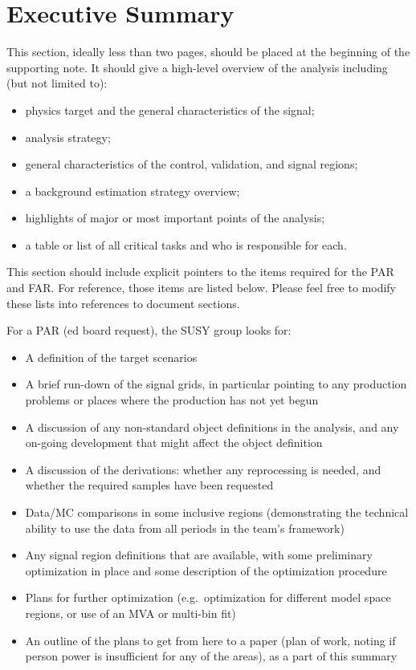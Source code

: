 \section{Executive Summary}

This section, ideally less than two pages, should be placed at the beginning of the supporting note.
It should give a high-level overview of the analysis including (but not limited to):
\begin{itemize}
\item physics target and the general characteristics of the signal;
\item analysis strategy;
\item general characteristics of the control, validation, and signal regions;
\item a background estimation strategy overview;
\item highlights of major or most important points of the analysis;
\item a table or list of all critical tasks and who is responsible for each.
\end{itemize}

This section should include explicit pointers to the items required for the PAR and FAR\@.  For reference, those items are listed below. Please feel free to modify these lists into references to document sections.

For a PAR (ed board request), the SUSY group looks for:
\begin{itemize}
\item A definition of the target scenarios
\item A brief run-down of the signal grids, in particular pointing to any production problems or places where the production has not yet begun
\item A discussion of any non-standard object definitions in the analysis, and any on-going development that might affect the object definition
\item A discussion of the derivations: whether any reprocessing is needed, and whether the required samples have been requested
\item Data/MC comparisons in some inclusive regions (demonstrating the technical ability to use the data from all periods in the team's framework)
\item Any signal region definitions that are available, with some preliminary optimization in place and some description of the optimization procedure
\item Plans for further optimization (e.g.\ optimization for different model space regions, or use of an MVA or multi-bin fit)
\item An outline of the plans to get from here to a paper (plan of work, noting if person power is insufficient for any of the areas), as a part of this summary
\end{itemize}

